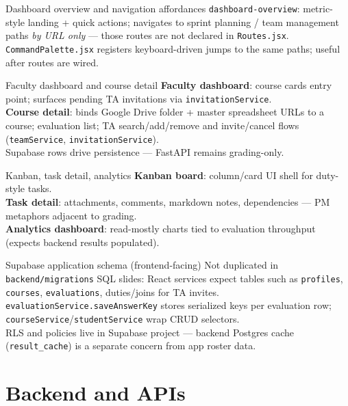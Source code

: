 \documentclass[aspectratio=169]{beamer}
\begin{document}
\begin{frame}{Dashboard overview and navigation affordances}
  \small
  \texttt{dashboard-overview}: metric-style landing + quick actions; navigates to sprint planning / team management paths \emph{by URL only} --- those routes are not declared in \texttt{Routes.jsx}.\\
  \texttt{CommandPalette.jsx} registers keyboard-driven jumps to the same paths; useful after routes are wired.
\end{frame}

\begin{frame}{Faculty dashboard and course detail}
  \small
  \textbf{Faculty dashboard}: course cards entry point; surfaces pending TA invitations via \texttt{invitationService}.\\
  \textbf{Course detail}: binds Google Drive folder + master spreadsheet URLs to a course; evaluation list; TA search/add/remove and invite/cancel flows (\texttt{teamService}, \texttt{invitationService}).\\
  Supabase rows drive persistence --- FastAPI remains grading-only.
\end{frame}

\begin{frame}{Kanban, task detail, analytics}
  \small
  \textbf{Kanban board}: column/card UI shell for duty-style tasks.\\
  \textbf{Task detail}: attachments, comments, markdown notes, dependencies --- PM metaphors adjacent to grading.\\
  \textbf{Analytics dashboard}: read-mostly charts tied to evaluation throughput (expects backend results populated).
\end{frame}

\begin{frame}{Supabase application schema (frontend-facing)}
  \tiny
  Not duplicated in \texttt{backend/migrations} SQL slides: React services expect tables such as \texttt{profiles}, \texttt{courses}, \texttt{evaluations}, duties/joins for TA invites.\\
  \texttt{evaluationService.saveAnswerKey} stores serialized keys per evaluation row; \texttt{courseService}/\texttt{studentService} wrap CRUD selectors.\\
  RLS and policies live in Supabase project --- backend Postgres cache (\texttt{result\_cache}) is a separate concern from app roster data.
\end{frame}

\section{Backend and APIs}
\end{document}
